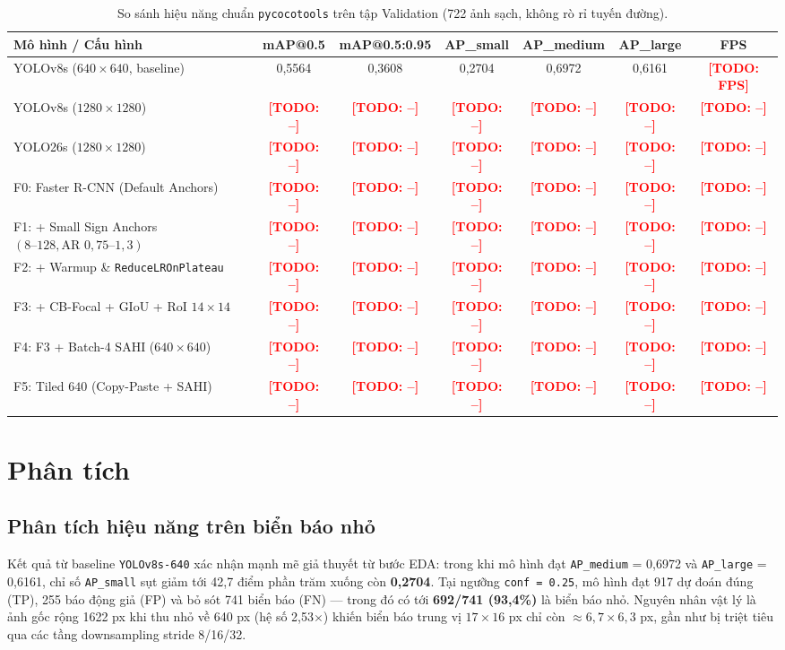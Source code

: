\documentclass[11pt]{article}
\newcommand{\todo}[1]{\textcolor{red}{\textbf{[TODO: #1]}}}
\begin{document}
\begin{table}[t]
\centering
\small
\begin{tabular}{@{}lcccccc@{}}
\toprule
\textbf{Mô hình / Cấu hình} & \textbf{mAP@0.5} & \textbf{mAP@0.5:0.95} & \textbf{AP\_small} & \textbf{AP\_medium} & \textbf{AP\_large} & \textbf{FPS} \\
\midrule
YOLOv8s ($640\times 640$, baseline) & 0,5564 & 0,3608 & 0,2704 & 0,6972 & 0,6161 & \todo{FPS} \\
YOLOv8s ($1280\times 1280$) & \todo{--} & \todo{--} & \todo{--} & \todo{--} & \todo{--} & \todo{--} \\
YOLO26s ($1280\times 1280$) & \todo{--} & \todo{--} & \todo{--} & \todo{--} & \todo{--} & \todo{--} \\
F0: Faster R-CNN (Default Anchors) & \todo{--} & \todo{--} & \todo{--} & \todo{--} & \todo{--} & \todo{--} \\
F1: + Small Sign Anchors $(8\text{--}128, \text{AR } 0{,}75\text{--}1{,}3)$ & \todo{--} & \todo{--} & \todo{--} & \todo{--} & \todo{--} & \todo{--} \\
F2: + Warmup \& \texttt{ReduceLROnPlateau} & \todo{--} & \todo{--} & \todo{--} & \todo{--} & \todo{--} & \todo{--} \\
F3: + CB-Focal + GIoU + RoI $14\times 14$ & \todo{--} & \todo{--} & \todo{--} & \todo{--} & \todo{--} & \todo{--} \\
F4: F3 + Batch-4 SAHI ($640\times 640$) & \todo{--} & \todo{--} & \todo{--} & \todo{--} & \todo{--} & \todo{--} \\
F5: Tiled $640$ (Copy-Paste + SAHI) & \todo{--} & \todo{--} & \todo{--} & \todo{--} & \todo{--} & \todo{--} \\
\bottomrule
\end{tabular}
\caption{So sánh hiệu năng chuẩn \texttt{pycocotools} trên tập Validation (722 ảnh sạch, không rò rỉ tuyến đường).}
\label{tab:main_results}
\end{table}

\section{Phân tích}
\label{sec:analysis}

\subsection{Phân tích hiệu năng trên biển báo nhỏ}
Kết quả từ baseline \texttt{YOLOv8s-640} xác nhận mạnh mẽ giả thuyết từ bước EDA: trong khi mô hình đạt \texttt{AP\_medium} = 0,6972 và \texttt{AP\_large} = 0,6161, chỉ số \texttt{AP\_small} sụt giảm tới 42,7 điểm phần trăm xuống còn \textbf{0,2704}. Tại ngưỡng \texttt{conf = 0.25}, mô hình đạt 917 dự đoán đúng (TP), 255 báo động giả (FP) và bỏ sót 741 biển báo (FN) — trong đó có tới \textbf{692/741 (93,4\%)} là biển báo nhỏ. Nguyên nhân vật lý là ảnh gốc rộng 1622 px khi thu nhỏ về 640 px (hệ số 2,53$\times$) khiến biển báo trung vị $17\times 16$ px chỉ còn $\approx 6{,}7\times 6{,}3$ px, gần như bị triệt tiêu qua các tầng downsampling stride 8/16/32.
\end{document}
